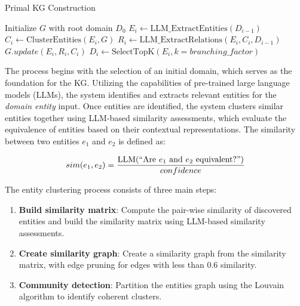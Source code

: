 \documentclass[11pt]{article}
\begin{document}
\begin{algorithm}[H]
    \caption{Primal KG Construction}
    \label{alg:primal}
    \begin{algorithmic}[1]
        \State Initialize $G$ with root domain $D_0$
        \State $E_i \gets \text{LLM\_ExtractEntities}(D_{i-1})$ 
        \State $C_i \gets \text{ClusterEntities}(E_i, G)$ 
        \State $R_i \gets \text{LLM\_ExtractRelations}(E_i, C_i, D_{i-1})$ 
        \State $G.update(E_i, R_i, C_i)$ 
        \State $D_i \gets \text{SelectTopK}(E_i, k=branching\_factor)$ 
        \EndFor
    \end{algorithmic}
\end{algorithm}

The process begins with the selection of an initial domain, which serves as the foundation for the KG. Utilizing the capabilities of pre-trained large language models (LLMs), the system identifies and extracts relevant entities for the \textit{domain entity} input. Once entities are identified, the system clusters similar entities together using LLM-based similarity assessments, which evaluate the equivalence of entities based on their contextual representations. The similarity between two entities $e_1$ and $e_2$ is defined as:

\begin{equation}
    sim(e_1,e_2) = \frac{\text{LLM}(``\text{Are }e_1\text{ and }e_2\text{ equivalent?''})}{confidence}
\end{equation}

The entity clustering process consists of three main steps:
\begin{enumerate}
    \item \textbf{Build similarity matrix}: Compute the pair-wise similarity of discovered entities and build the similarity matrix using LLM-based similarity assessments.
    \item \textbf{Create similarity graph}: Create a similarity graph from the similarity matrix, with edge pruning for edges with less than 0.6 similarity.
    \item \textbf{Community detection}: Partition the entities graph using the Louvain algorithm to identify coherent clusters.
\end{enumerate}
\end{document}
